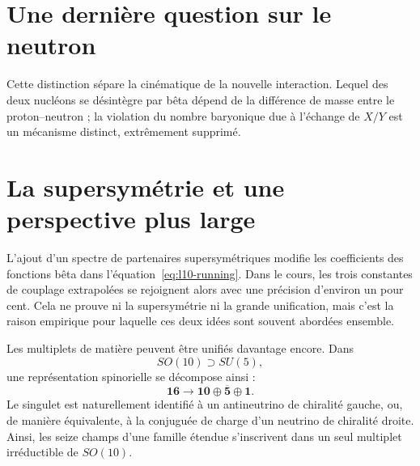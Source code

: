 \section{Une dernière question sur le neutron}

\begin{classroomqa}
\end{classroomqa}

Cette distinction sépare la cinématique de la nouvelle interaction. Lequel des deux nucléons se désintègre par bêta dépend de la différence de masse entre le proton--neutron ; la violation du nombre baryonique due à l’échange de \(X/Y\) est un mécanisme distinct, extrêmement supprimé.

\section{La supersymétrie et une perspective plus large}

L’ajout d’un spectre de partenaires supersymétriques modifie les coefficients des fonctions bêta dans l’équation~\eqref{eq:l10-running}. Dans le cours, les trois constantes de couplage extrapolées se rejoignent alors avec une précision d’environ un pour cent. Cela ne prouve ni la supersymétrie ni la grande unification, mais c’est la raison empirique pour laquelle ces deux idées sont souvent abordées ensemble.

Les multiplets de matière peuvent être unifiés davantage encore. Dans
\begin{equation}
SO(10)\supset SU(5),
\end{equation}
une représentation spinorielle se décompose ainsi :
\begin{equation}
\mathbf{16}
\longrightarrow
\mathbf{10}\oplus\overline{\mathbf5}\oplus\mathbf1.
\label{eq:l10-so10}
\end{equation}
Le singulet est naturellement identifié à un antineutrino de chiralité gauche, ou, de manière équivalente, à la conjuguée de charge d’un neutrino de chiralité droite. Ainsi, les seize champs d’une famille étendue s’inscrivent dans un seul multiplet irréductible de \(SO(10)\).


